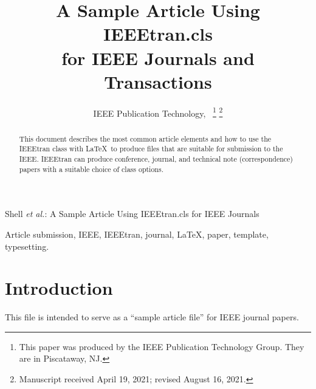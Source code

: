 \documentclass[lettersize,journal]{IEEEtran}
\begin{document}
\title{A Sample Article Using IEEEtran.cls\\ for IEEE Journals and Transactions}

\author{IEEE Publication Technology,~
\thanks{This paper was produced by the IEEE Publication Technology Group. They are in Piscataway, NJ.}
\thanks{Manuscript received April 19, 2021; revised August 16, 2021.}}

%
{Shell \MakeLowercase{\textit{et al.}}: A Sample Article Using IEEEtran.cls for IEEE Journals}


\maketitle

\begin{abstract}
This document describes the most common article elements and how to use the IEEEtran class with \LaTeX \ to produce files that are suitable for submission to the IEEE. IEEEtran can produce conference, journal, and technical note (correspondence) papers with a suitable choice of class options.
\end{abstract}

\begin{IEEEkeywords}
Article submission, IEEE, IEEEtran, journal, \LaTeX, paper, template, typesetting.
\end{IEEEkeywords}

\section{Introduction}
This file is intended to serve as a ``sample article file'' for IEEE journal papers.
\end{document}
